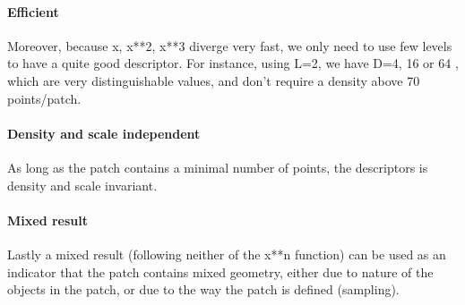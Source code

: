 			\paragraph{Efficient}
				Moreover, because x, x**2, x**3 diverge very fast, we only need to use few levels to have a quite good descriptor. For instance, using L=2, we have D=4, 16 or 64 , which are very distinguishable values, and don't require a density above 70 points/patch. 
			\paragraph{Density and scale independent}
				As long as the patch contains a minimal number of points, the descriptors is density and scale invariant.
			\paragraph{Mixed result}
				Lastly a mixed result (following neither of the x**n function) can be used as an indicator that the patch contains mixed geometry, either due to nature of the objects in the patch, or due to the way the patch is defined (sampling).
				
			
			
		
		
		
